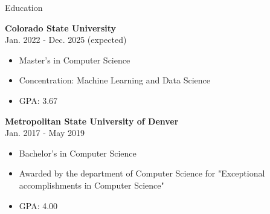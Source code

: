 \documentclass[12pt]{resumeclass}
\begin{document}
\vspace{12pt}
\resumesect
    {Education}
    {\textbf{Colorado State University}\\
    \normalsize{Jan. 2022 - Dec. 2025 (expected)}
    {\begin{itemize}[noitemsep,nolistsep]
	    \item Master's in Computer Science
	    \item Concentration: Machine Learning and Data Science
	    \item GPA: 3.67
    \end{itemize}}


    \vspace{3pt}
    \textbf{Metropolitan State University of Denver}\\
    \normalsize{Jan. 2017 - May 2019}
    {\begin{itemize}[noitemsep,nolistsep]
	    \item Bachelor's in Computer Science
	    \item Awarded by the department of Computer Science for "Exceptional accomplishments in Computer Science"
	    \item GPA: 4.00
    \end{itemize}}}
\vspace{12pt}
\end{document}
